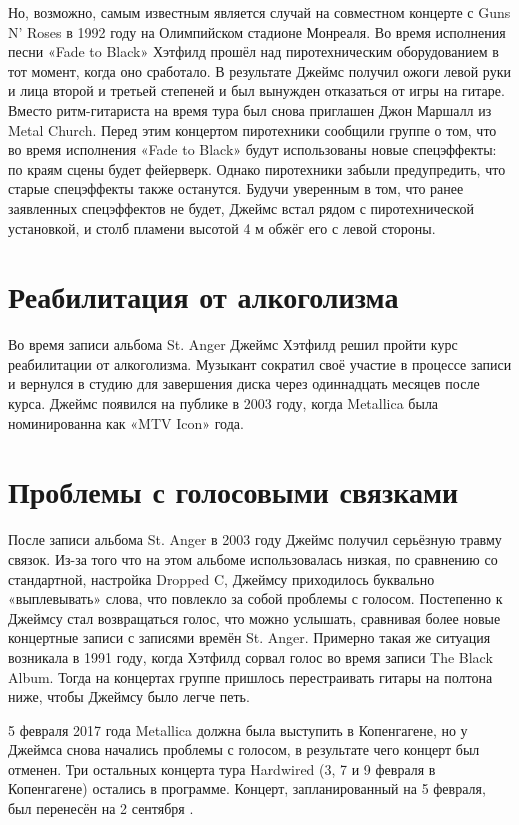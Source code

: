 \documentclass[a4paper,12pt,leqno]{article}
\theoremstyle{plain} %
\theoremstyle{definition} %
\theoremstyle{remark} %
\begin{document}
Но, возможно, самым известным является случай на совместном концерте с Guns N’ Roses в 1992 году на Олимпийском стадионе Монреаля. Во время исполнения песни «Fade to Black» Хэтфилд прошёл над пиротехническим оборудованием в тот момент, когда оно сработало. В результате Джеймс получил ожоги левой руки и лица второй и третьей степеней и был вынужден отказаться от игры на гитаре. Вместо ритм-гитариста на время тура был снова приглашен Джон Маршалл из Metal Church. Перед этим концертом пиротехники сообщили группе о том, что во время исполнения «Fade to Black» будут использованы новые спецэффекты: по краям сцены будет фейерверк. Однако пиротехники забыли предупредить, что старые спецэффекты также останутся. Будучи уверенным в том, что ранее заявленных спецэффектов не будет, Джеймс встал рядом с пиротехнической установкой, и столб пламени высотой 4 м обжёг его с левой стороны.

\section{Реабилитация от алкоголизма}

Во время записи альбома St. Anger Джеймс Хэтфилд решил пройти курс реабилитации от алкоголизма. Музыкант сократил своё участие в процессе записи и вернулся в студию для завершения диска через одиннадцать месяцев после курса. Джеймс появился на публике в 2003 году, когда Metallica была номинированна как «MTV Icon» года.

\section{Проблемы с голосовыми связками}

После записи альбома St. Anger в 2003 году Джеймс получил серьёзную травму связок. Из-за того что на этом альбоме использовалась низкая, по сравнению со стандартной, настройка Dropped C, Джеймсу приходилось буквально «выплевывать» слова, что повлекло за собой проблемы с голосом. Постепенно к Джеймсу стал возвращаться голос, что можно услышать, сравнивая более новые концертные записи с записями времён St. Anger. Примерно такая же ситуация возникала в 1991 году, когда Хэтфилд сорвал голос во время записи The Black Album. Тогда на концертах группе пришлось перестраивать гитары на полтона ниже, чтобы Джеймсу было легче петь.

5 февраля 2017 года Metallica должна была выступить в Копенгагене, но у Джеймса снова начались проблемы с голосом, в результате чего концерт был отменен. Три остальных концерта тура Hardwired (3, 7 и 9 февраля в Копенгагене) остались в программе. Концерт, запланированный на 5 февраля, был перенесён на 2 сентября \cite{4}.
\end{document}
